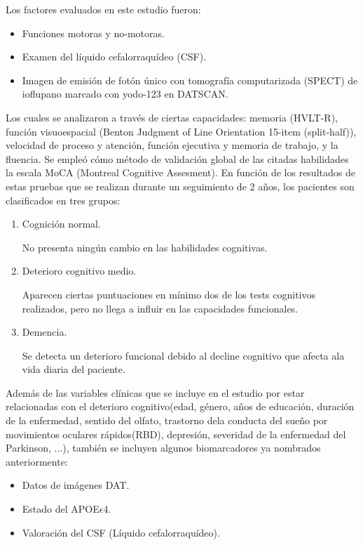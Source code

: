 	Los factores evaluados en este estudio fueron: 
	\begin{itemize}
		\item Funciones motoras y no-motoras.
		\item Examen del líquido cefalorraquídeo (CSF).
		\item Imagen de emisión de fotón único con tomografía computarizada (SPECT) de ioflupano marcado con yodo-123 en DATSCAN.
	\end{itemize}
	
	Los cuales se analizaron a través de ciertas capacidades: memoria (HVLT-R), función visuoespacial (Benton Judgment of Line Orientation 15-item (split-half)), velocidad de proceso y atención, función ejecutiva y memoria de trabajo, y la fluencia. Se empleó cómo método de validación global de las citadas habilidades la escala MoCA (Montreal Cognitive Assesment). En función de los resultados de estas pruebas que se realizan durante un seguimiento de 2 años, los pacientes son clasificados en tres grupos:
	\begin{enumerate}
		\item Cognición normal.
		
		No presenta ningún cambio en las habilidades cognitivas.
		
		\item Deterioro cognitivo medio.
		
		Aparecen ciertas puntuaciones en mínimo dos de los tests cognitivos  realizados, pero no llega a influir en las capacidades funcionales.
		
		\item Demencia.	
		
		Se detecta un deterioro funcional debido al decline cognitivo que afecta ala vida diaria del paciente.
	\end{enumerate}
	
	Además de las variables clínicas que se incluye en el estudio por estar relacionadas con el deterioro cognitivo(edad, género, años de educación, duración de la enfermedad, sentido del olfato, trastorno dela conducta del sueño por movimientos oculares rápidos(RBD), depresión, severidad de la enfermedad del Parkinson, ...), también se incluyen algunos biomarcadores ya nombrados anteriormente: 
	\begin{itemize}
		\item Datos de imágenes DAT.
		\item Estado del APOE$\epsilon$4.
		\item Valoración del CSF (Líquido cefalorraquídeo).
	\end{itemize}
	
